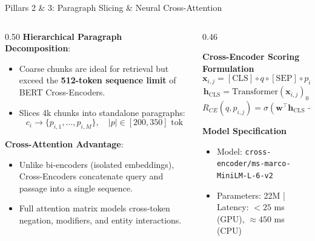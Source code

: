 \documentclass[10pt,aspectratio=169]{beamer}
\begin{document}
\begin{frame}{Pillars 2 \& 3: Paragraph Slicing \& Neural Cross-Attention}
    \begin{columns}[onlytextwidth,T]
        \begin{column}{0.50\textwidth}
            \textbf{Hierarchical Paragraph Decomposition}:
            \begin{itemize}\setlength\itemsep{2pt}
                \item Coarse chunks are ideal for retrieval but exceed the \textbf{512-token sequence limit} of BERT Cross-Encoders.
                \item Slices 4k chunks into standalone paragraphs:
                $$c_i \longrightarrow \{p_{i,1}, \dots, p_{i,M}\}, \quad |p| \in [200, 350]\text{ tok}$$
            \end{itemize}
            
            \vspace{0.1cm}
            \textbf{Cross-Attention Advantage}:
            \begin{itemize}\setlength\itemsep{2pt}
                \item Unlike bi-encoders (isolated embeddings), Cross-Encoders concatenate query and passage into a single sequence.
                \item Full attention matrix models cross-token negation, modifiers, and entity interactions.
            \end{itemize}
        \end{column}
        
        \begin{column}{0.46\textwidth}
            \begin{exampleblock}{\textbf{Cross-Encoder Scoring Formulation}}
                \footnotesize
                $$\mathbf{x}_{i,j} = [\text{CLS}] \circ q \circ [\text{SEP}] \circ p_{i,j} \circ [\text{SEP}]$$
                $$\mathbf{h}_{\text{CLS}} = \text{Transformer}(\mathbf{x}_{i,j})_0$$
                $$R_{CE}(q, p_{i,j}) = \sigma(\mathbf{w}^\top \mathbf{h}_{\text{CLS}} + b) \in [0, 1]$$
            \end{exampleblock}
            \vspace{0.1cm}
            \begin{block}{\textbf{Model Specification}}
                \footnotesize
                \begin{itemize}\setlength\itemsep{1pt}
                    \item Model: \texttt{cross-encoder/ms-marco-MiniLM-L-6-v2}
                    \item Parameters: 22M | Latency: $<25$ ms (GPU), $\approx 450$ ms (CPU)
                \end{itemize}
            \end{block}
        \end{column}
    \end{columns}
\end{frame}
\end{document}
